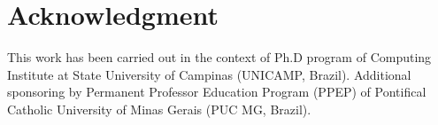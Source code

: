 \documentclass[10pt, conference]{IEEEtran}
\begin{document}
\section*{Acknowledgment}
This work has been carried out in the context of Ph.D program of  Computing Institute at State University of Campinas (UNICAMP, Brazil). Additional sponsoring by Permanent Professor Education Program (PPEP) of Pontifical Catholic University of Minas Gerais (PUC MG, Brazil). 





%
%





\end{document}
